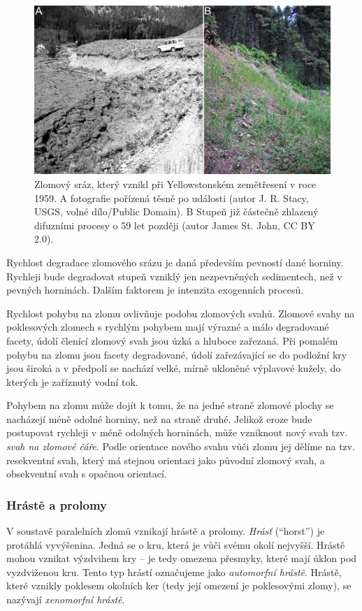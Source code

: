 \begin{figure}[h]
	\centering
	\includegraphics[width=1\linewidth]{obrazky/tectonic/fault_scarp}
	\caption{Zlomový sráz, který vznikl při Yellowstonském zemětřesení v roce 1959. A fotografie pořízená těsně po události (autor J. R. Stacy, USGS, volné dílo/Public Domain). B Stupeň již částečně zhlazený difuzními procesy o 59 let později (autor James St. John, CC BY 2.0).}
	\label{fig:faultscarp}
\end{figure}

Rychlost degradace zlomového srázu je daná především pevností dané horniny. Rychleji bude degradovat stupeň vzniklý jen nezpevněných sedimentech, než v pevných horninách. Dalším faktorem je intenzita exogenních procesů. 

Rychlost pohybu na zlomu ovlivňuje podobu zlomových svahů. Zlomové svahy na poklesových zlomech s rychlým pohybem mají výrazné a málo degradované facety, údolí členící zlomový svah jsou úzká a hluboce zařezaná. Při pomalém pohybu na zlomu jsou facety degradované, údolí zařezávající se do podložní kry jsou široká a v předpolí se nachází velké, mírně ukloněné výplavové kužely, do kterých je zaříznutý vodní tok. 

Pohybem na zlomu může dojít k tomu, že na jedné straně zlomové plochy se nacházejí méně odolné horniny, než na straně druhé. Jelikož eroze bude postupovat rychleji v méně odolných horninách, může vzniknout nový svah tzv. \emph{svah na zlomové čáře}. Podle orientace nového svahu vůči zlomu jej dělíme na tzv. resekventní svah, který má stejnou orientaci jako původní zlomový svah, a obsekventní svah s opačnou orientací.

\subsubsection{Hrástě a prolomy}
V soustavě paralelních zlomů vznikají hrástě a prolomy. \emph{Hrásť} (\enquote{horst}) je protáhlá vyvýšenina. Jedná se o kru, která je vůči svému okolí nejvyšší. Hrástě mohou vznikat výzdvihem kry -- je tedy omezena přesmyky, které mají úklon pod vyzdviženou kru. Tento typ hrástí označujeme jako \emph{automorfní hrástě}. Hrástě, které vznikly poklesem okolních ker (tedy její omezení je poklesovými zlomy), se nazývají \emph{xenomorfní hrástě}.

